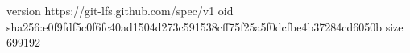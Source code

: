version https://git-lfs.github.com/spec/v1
oid sha256:e0f9fdf5c0f6fc40ad1504d273c591538cff75f25a5f0dcfbe4b37284cd6050b
size 699192
